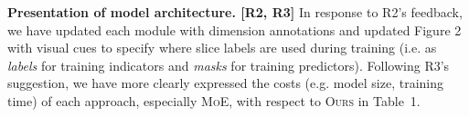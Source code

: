 \documentclass{article}
\begin{document}

\textbf{Presentation of model architecture. [R2, R3]}
In response to R2's feedback, we have updated each module with dimension annotations and updated Figure 2 with visual cues to specify where slice labels are used during training (i.e. as \textit{labels} for training indicators and \textit{masks} for training predictors).
Following R3's suggestion, we have more clearly expressed the costs (e.g. model size, training time) of each approach, especially \textsc{MoE}, with respect to \textsc{Ours} in Table~1.
\end{document}
